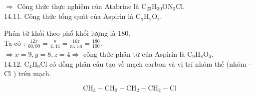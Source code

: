 \documentclass[10pt]{article}
\begin{document}
$\Rightarrow$ Công thức thực nghiệm của Atabrine là $\mathrm{C}_{23} \mathrm{H}_{30} \mathrm{ON}_{3} \mathrm{Cl}$.\\
14.11. Công thức tổng quát của Aspirin là $\mathrm{C}_{\mathrm{x}} \mathrm{H}_{\mathrm{y}} \mathrm{O}_{\mathrm{z}}$.

Phân tử khối theo phổ khối lượng là 180.\\
Ta có : $\frac{12 x}{60,00}=\frac{y}{4,44}=\frac{16 z}{35,56}=\frac{180}{100}$.\\
$\Rightarrow x=9, y=8, z=4 \Rightarrow$ công thức phân tử của Aspirin là $\mathrm{C}_{9} \mathrm{H}_{8} \mathrm{O}_{4}$.\\
14.12. $\mathrm{C}_{4} \mathrm{H}_{9} \mathrm{Cl}$ có đồng phân cấu tạo về mạch carbon và vị trí nhóm thế (nhóm -Cl ) trên mạch.

$$
\mathrm{CH}_{3}-\mathrm{CH}_{2}-\mathrm{CH}_{2}-\mathrm{CH}_{2}-\mathrm{Cl}
$$
\end{document}
